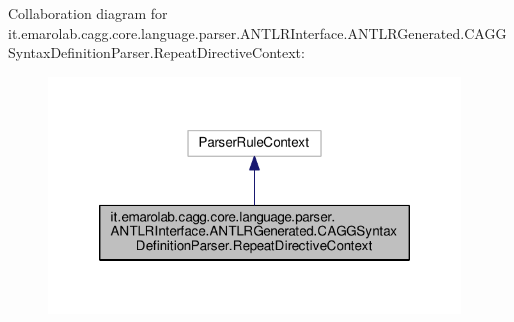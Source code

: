 Collaboration diagram for it.\-emarolab.\-cagg.\-core.\-language.\-parser.\-A\-N\-T\-L\-R\-Interface.\-A\-N\-T\-L\-R\-Generated.\-C\-A\-G\-G\-Syntax\-Definition\-Parser.\-Repeat\-Directive\-Context\-:
\nopagebreak
\begin{figure}[H]
\begin{center}
\leavevmode
\includegraphics[width=310pt]{classit_1_1emarolab_1_1cagg_1_1core_1_1language_1_1parser_1_1ANTLRInterface_1_1ANTLRGenerated_1_a984ade2bdcf57480e5ea58924c9baca}
\end{center}
\end{figure}
